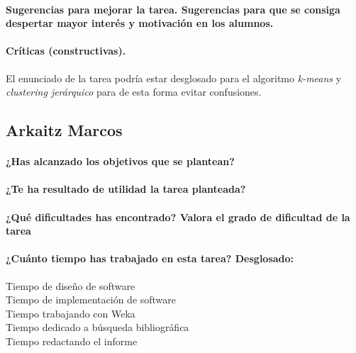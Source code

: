 \documentclass[11pt, titlepage,a4paper]{article}
\begin{document}
\paragraph{Sugerencias para mejorar la tarea. Sugerencias para que se consiga despertar mayor
interés y motivación en los alumnos.\\}

\paragraph{Críticas (constructivas).\\}
El enunciado de la tarea podría estar desglosado para el algoritmo
\textit{k-means} y \textit{clustering jerárquico} para de esta forma evitar confusiones.

\subsection{Arkaitz Marcos}
\paragraph{¿Has alcanzado los objetivos que se plantean?\\}

\paragraph{¿Te ha resultado de utilidad la tarea planteada?\\}

\paragraph{¿Qué dificultades has encontrado? Valora el grado de dificultad de
la tarea\\}

\paragraph{¿Cuánto tiempo has trabajado en esta tarea? Desglosado:\\}
\begin{description}
	\item[Tiempo de diseño de software]
	\item[Tiempo de implementación de software]
	\item[Tiempo trabajando con Weka]
	\item[Tiempo dedicado a búsqueda bibliográfica]
	\item[Tiempo redactando el informe]
\end{description}
\end{document}
